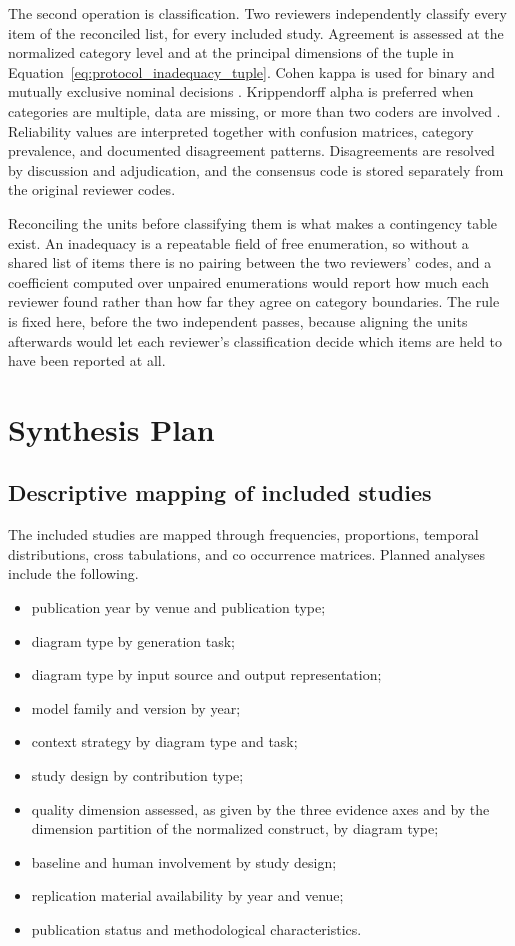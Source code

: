 The second operation is classification. Two reviewers independently classify every item of the reconciled list, for every included study. Agreement is assessed at the normalized category level and at the principal dimensions of the tuple in Equation~\ref{eq:protocol_inadequacy_tuple}. Cohen kappa is used for binary and mutually exclusive nominal decisions \cite{Cohen1960Kappa}. Krippendorff alpha is preferred when categories are multiple, data are missing, or more than two coders are involved \cite{Krippendorff2018Content}. Reliability values are interpreted together with confusion matrices, category prevalence, and documented disagreement patterns. Disagreements are resolved by discussion and adjudication, and the consensus code is stored separately from the original reviewer codes.

Reconciling the units before classifying them is what makes a contingency table exist. An inadequacy is a repeatable field of free enumeration, so without a shared list of items there is no pairing between the two reviewers' codes, and a coefficient computed over unpaired enumerations would report how much each reviewer found rather than how far they agree on category boundaries. The rule is fixed here, before the two independent passes, because aligning the units afterwards would let each reviewer's classification decide which items are held to have been reported at all.

\section{Synthesis Plan}
\label{sec:protocol_synthesis}

\subsection{Descriptive mapping of included studies}

The included studies are mapped through frequencies, proportions, temporal distributions, cross tabulations, and co occurrence matrices. Planned analyses include the following.

\begin{itemize}
    \item publication year by venue and publication type;
    \item diagram type by generation task;
    \item diagram type by input source and output representation;
    \item model family and version by year;
    \item context strategy by diagram type and task;
    \item study design by contribution type;
    \item quality dimension assessed, as given by the three evidence axes and by the dimension partition of the normalized construct, by diagram type;
    \item baseline and human involvement by study design;
    \item replication material availability by year and venue;
    \item publication status and methodological characteristics.
\end{itemize}

